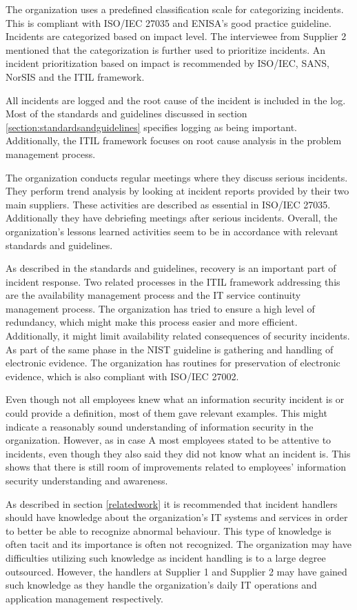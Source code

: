 The organization uses a predefined classification scale for categorizing incidents. This is compliant with ISO/IEC 27035 and ENISA's good practice guideline. Incidents are categorized based on impact level. The interviewee from Supplier 2 mentioned that the categorization is further used to prioritize incidents. An incident prioritization based on impact is recommended by ISO/IEC, SANS, NorSIS and the ITIL framework.

All incidents are logged and the root cause of the incident is included in the log. Most of the standards and guidelines discussed in section \ref{section:standardsandguidelines} specifies logging as being important. Additionally, the ITIL framework focuses on root cause analysis in the problem management process.

The organization conducts regular meetings where they discuss serious incidents. They perform trend analysis by looking at incident reports provided by their two main suppliers. These activities are described as essential in ISO/IEC 27035. Additionally they have debriefing meetings after serious incidents. Overall, the organization's lessons learned activities seem to be in accordance with relevant standards and guidelines.

As described in the standards and guidelines, recovery is an important part of incident response. Two related processes in the ITIL framework addressing this are the availability management process and the IT service continuity management process. The organization has tried to ensure a high level of redundancy, which might make this process easier and more efficient. Additionally, it might limit availability related consequences of security incidents. As part of the same phase in the NIST guideline is gathering and handling of electronic evidence. The organization has routines for preservation of electronic evidence, which is also compliant with ISO/IEC 27002.

Even though not all employees knew what an information security incident is or could provide a definition, most of them gave relevant examples. This might indicate a reasonably sound understanding of information security in the organization. However, as in case A most employees stated to be attentive to incidents, even though they also said they did not know what an incident is. This shows that there is still room of improvements related to employees' information security understanding and awareness.

As described in section \ref{relatedwork} it is recommended that incident handlers should have knowledge about the organization's IT systems and services in order to better be able to recognize abnormal behaviour. This type of knowledge is often tacit and its importance is often not recognized. The organization may have difficulties utilizing such knowledge as incident handling is to a large degree outsourced. However, the handlers at Supplier 1 and Supplier 2 may have gained such knowledge as they handle the organization's daily IT operations and application management respectively. %

